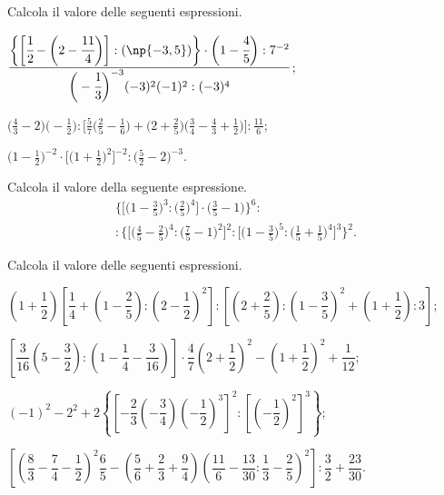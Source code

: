 \begin{esercizio}[\Ast]%
 Calcola il valore delle seguenti espressioni.
\begin{enumeratea}
\spazielenx
\item $\displaystyle{\frac{\bigg\{\bigg[\cfrac{1}{2}-\bigg(2-\cfrac{11}{4}\bigg)\bigg]:(\np{-3,5})\bigg\}\cdot
\bigg(1-\cfrac{4}{5}\bigg):7^{-2}}{\bigg(-{\cfrac{1}{3}}\bigg)^{-3}(-3)^{2}(-1)^{2}:(-3)^{4}}}$;
\item $\displaystyle{\bigg(\frac{4}{3}-2\bigg)\bigg(-{\frac{1}{2}}\bigg):\bigg[\frac{5}{7}\bigg(\frac{2}{5}-\frac{1}{6}\bigg)
+\bigg(2+\frac{2}{5}\bigg)\bigg(\frac{3}{4}-\frac{4}{3}+\frac{1}{2}\bigg)\bigg]:\frac{11}{6}}$;
\item $\displaystyle{\bigg(1-\frac{1}{2}\bigg)^{-2}\cdot
\bigg[\bigg(1+\frac{1}{2}\bigg)^{2}\bigg]^{-2}:\bigg(\frac{5}{2}-2\bigg)^{-3}}$.
\end{enumeratea}
\end{esercizio}

\begin{esercizio}[\Ast]%
Calcola il valore della seguente espressione.
\begin{multline*}
 \bigg\{\bigg[\bigg(1-\frac{3}{5}\bigg)^3:\bigg(\frac{2}{5}\bigg)^{4}\bigg]\cdot\bigg(\frac{3}{5}-1\bigg)%
\bigg\}^{6}:\\
:\bigg\{\bigg[\bigg(\frac{4}{5}-\frac{2}{5}\bigg)^{4}:\bigg(\frac{7}{5}-1\bigg)^2\bigg]^{2}:%
\bigg[\bigg(1-\frac{3}{5}\bigg)^{5}:\bigg(\frac{1}{5}+\frac{1}{5}\bigg)^{4}\bigg]^{3}\bigg\}^{2}.
\end{multline*}
\end{esercizio}

\begin{esercizio}[\Ast]%
 Calcola il valore delle seguenti espressioni.
\begin{enumeratea}
\spazielenx
\item $\left(1+\dfrac{1}{2}\right)\left[\dfrac{1}{4}+\left(1-\dfrac{2}{5}\right):\left(2-\dfrac{1}{2}\right)^2\right]:
\left[\left(2+\dfrac{2}{5}\right):\left(1-\dfrac{3}{5}\right)^2+\left(1+\dfrac{1}{2}\right):3\right]$;
\item $\left[\dfrac{3}{16}\left(5-\dfrac{3}{2}\right):\left(1-\dfrac{1}{4}-\dfrac{3}{16}\right)\right]\cdot \dfrac{4}{7}
\left(2+\dfrac{1}{2}\right)^2-\left(1+\dfrac{1}{2}\right)^2+\dfrac{1}{12}$;
\item $(-1)^2-2^2+2\left\lbrace\left[-\dfrac{2}{3}\left(-\dfrac{3}{4}\right)\left(-\dfrac{1}{2}\right)^3\right]^2:\left[\left(-\dfrac{1}{2}\right)^2\right]^3\right\rbrace$;
\item $\left[\left(\dfrac{8}{3}-\dfrac{7}{4}-\dfrac{1}{2}\right)^2\dfrac{6}{5}-\left(\dfrac{5}{6}+\dfrac{2}{3}+\dfrac{9}{4}\right)
\left(\dfrac{11}{6}-\dfrac{13}{30}:\dfrac{1}{3}-\dfrac{2}{5}\right)^2\right]:\dfrac{3}{2}+\dfrac{23}{30}$.
\end{enumeratea}
\end{esercizio}

